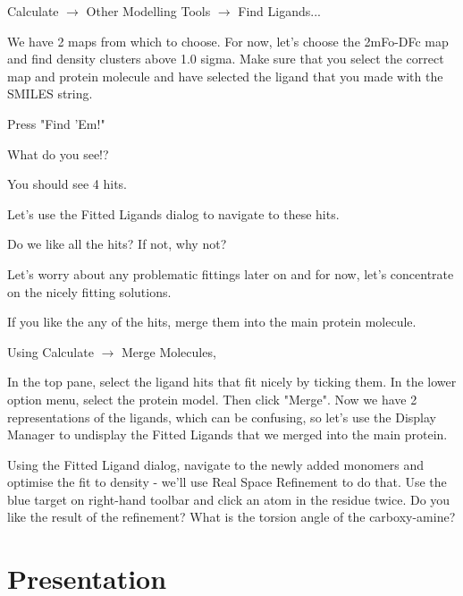 \documentclass{article}
\begin{document}
 \textsf{Calculate $\rightarrow$ Other Modelling Tools $\rightarrow$ Find Ligands...}

 We have 2 maps from which to choose.  For now, let's choose the
 2mFo-DFc map and find density clusters above 1.0 sigma.  Make sure
 that you select the correct map and protein molecule and have
 selected the ligand that you made with the SMILES string.

 Press \textsf{"Find 'Em!"}

 \begin{trivlist}
 \item What do you see!? 

\textsf{You should see 4 hits.  }
 \end{trivlist}




Let's use the Fitted Ligands dialog to navigate to these hits.

\begin{trivlist}
\item Do we like all the hits?  If not, why not?  

\textsf{Let's worry about any problematic fittings later on and for
 now, let's concentrate on the nicely fitting solutions.}
\end{trivlist}


\begin{trivlist}
\item If you like the any of the hits, merge them into the main
  protein molecule.

Using \textsf{Calculate $\rightarrow$ Merge Molecules}, 

\end{trivlist}

 In the top pane, select the ligand hits that fit nicely by ticking
 them.  In the lower option menu, select the protein model.  Then
 click "Merge".  Now we have 2 representations of the ligands, which
 can be confusing, so let's use the Display Manager to undisplay the
 Fitted Ligands that we merged into the main protein.

 Using the Fitted Ligand dialog, navigate to the newly added monomers
 and optimise the fit to density - we'll use Real Space Refinement to
 do that.  Use the blue target on right-hand toolbar and click an atom
 in the residue twice.  Do you like the result of the refinement?
 What is the torsion angle of the carboxy-amine?

\section{Presentation}
\end{document}
